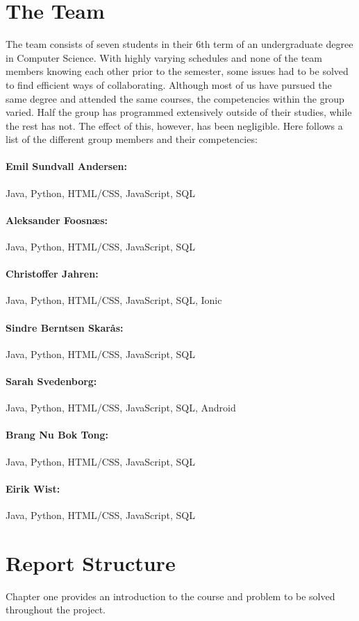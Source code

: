 \section{The Team}
The team consists of seven students in their 6th term of an undergraduate degree in Computer Science. With highly varying schedules and none of the team members knowing each other prior to the semester, some issues had to be solved to find efficient ways of collaborating. Although most of us have pursued the same degree and attended the same courses, the competencies within the group varied. Half the group has programmed extensively outside of their studies, while the rest has not. The effect of this, however, has been negligible. Here follows a list of the different group members and their competencies:

\paragraph*{Emil Sundvall Andersen:} Java, Python, HTML/CSS, JavaScript, SQL
\paragraph*{Aleksander Foosnæs:} Java, Python, HTML/CSS, JavaScript, SQL
\paragraph*{Christoffer Jahren:} Java, Python, HTML/CSS, JavaScript, SQL, Ionic
\paragraph*{Sindre Berntsen Skarås:} Java, Python, HTML/CSS, JavaScript, SQL
\paragraph*{Sarah Svedenborg:} Java, Python, HTML/CSS, JavaScript, SQL, Android
\paragraph*{Brang Nu Bok Tong:} Java, Python, HTML/CSS, JavaScript, SQL
\paragraph*{Eirik Wist:} Java, Python, HTML/CSS, JavaScript, SQL


\section{Report Structure}
Chapter one provides an introduction to the course and problem to be solved throughout the project.  

